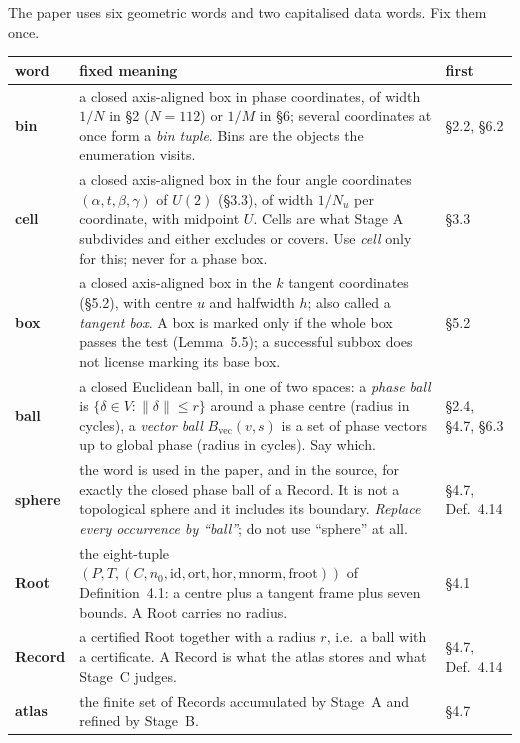 \documentclass[11pt]{article}
\begin{document}
The paper uses six geometric words and two capitalised data words. Fix them once.

\begin{longtable}{@{}L{1.9cm}L{9.6cm}L{2.0cm}@{}}
\hline
word & fixed meaning & first \\
\hline
\endhead
\textbf{bin} & a closed axis-aligned box in phase coordinates, of width $1/N$ in \S2 ($N=112$) or
  $1/M$ in \S6; several coordinates at once form a \emph{bin tuple}. Bins are the objects the
  enumeration visits. & \S2.2, \S6.2 \\
\textbf{cell} & a closed axis-aligned box in the four angle coordinates $(\alpha,t,\beta,\gamma)$ of
  $U(2)$ (\S3.3), of width $1/N_u$ per coordinate, with midpoint $U$. Cells are what Stage A
  subdivides and either excludes or covers. Use \emph{cell} only for this; never for a phase box. & \S3.3 \\
\textbf{box} & a closed axis-aligned box in the $k$ tangent coordinates (\S5.2), with centre $u$ and
  halfwidth $h$; also called a \emph{tangent box}. A box is marked only if the whole box passes the
  test (Lemma~5.5); a successful subbox does not license marking its base box. & \S5.2 \\
\textbf{ball} & a closed Euclidean ball, in one of two spaces: a \emph{phase ball} is
  $\{\delta\in V:\|\delta\|\le r\}$ around a phase centre (radius in cycles), a \emph{vector ball}
  $B_{\mathrm{vec}}(v,s)$ is a set of phase vectors up to global phase (radius in cycles). Say which. & \S2.4, \S4.7, \S6.3 \\
\textbf{sphere} & the word is used in the paper, and in the source, for exactly the closed phase ball
  of a Record. It is not a topological sphere and it includes its boundary. \emph{Replace every
  occurrence by ``ball''}; do not use ``sphere'' at all. & \S4.7, Def.~4.14 \\
\textbf{Root} & the eight-tuple $(P,T,(C,n_0,\mathrm{id},\mathrm{ort},\mathrm{hor},\mathrm{mnorm},\mathrm{froot}))$
  of Definition~4.1: a centre plus a tangent frame plus seven bounds. A Root carries no radius. & \S4.1 \\
\textbf{Record} & a certified Root together with a radius $r$, i.e.\ a ball with a certificate. A
  Record is what the atlas stores and what Stage~C judges. & \S4.7, Def.~4.14 \\
\textbf{atlas} & the finite set of Records accumulated by Stage~A and refined by Stage~B. & \S4.7 \\
\hline
\end{longtable}
\end{document}
